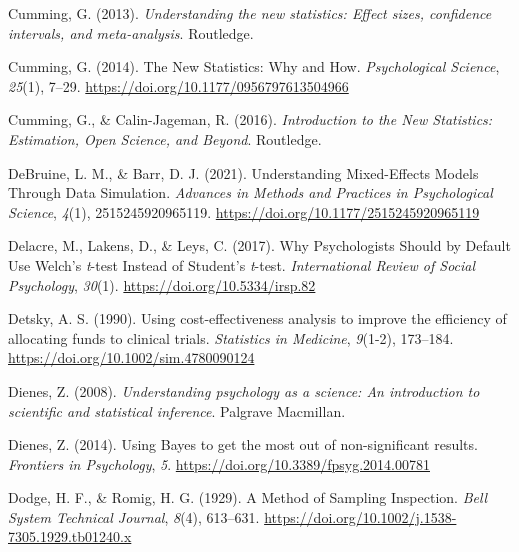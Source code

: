 \documentclass[
  letterpaper,
  DIV=11,
  numbers=noendperiod]{scrreprt}
\newlength{\cslhangindent}
\newlength{\cslentryspacingunit} %
\newenvironment{CSLReferences}[2] %
 {%
  \setlength{\parindent}{0pt}
  \ifodd #1
  \let\oldpar\par
  \def\par{\hangindent=\cslhangindent\oldpar}
  \fi
  \setlength{\parskip}{#2\cslentryspacingunit}
 }%
 {}
\begin{document}
\begin{CSLReferences}{1}{0}
\leavevmode{}%
Cumming, G. (2013). \emph{Understanding the new statistics: {Effect}
sizes, confidence intervals, and meta-analysis}. {Routledge}.

\leavevmode{}%
Cumming, G. (2014). The {New Statistics}: {Why} and {How}.
\emph{Psychological Science}, \emph{25}(1), 7--29.
\url{https://doi.org/10.1177/0956797613504966}

\leavevmode{}%
Cumming, G., \& Calin-Jageman, R. (2016). \emph{Introduction to the {New
Statistics}: {Estimation}, {Open Science}, and {Beyond}}. {Routledge}.

\leavevmode{}%
DeBruine, L. M., \& Barr, D. J. (2021). Understanding {Mixed-Effects
Models Through Data Simulation}. \emph{Advances in Methods and Practices
in Psychological Science}, \emph{4}(1), 2515245920965119.
\url{https://doi.org/10.1177/2515245920965119}

\leavevmode{}%
Delacre, M., Lakens, D., \& Leys, C. (2017). Why {Psychologists Should}
by {Default Use Welch}'s {\emph{t}}-test {Instead} of {Student}'s
{\emph{t}}-test. \emph{International Review of Social Psychology},
\emph{30}(1). \url{https://doi.org/10.5334/irsp.82}

\leavevmode{}%
Detsky, A. S. (1990). Using cost-effectiveness analysis to improve the
efficiency of allocating funds to clinical trials. \emph{Statistics in
Medicine}, \emph{9}(1-2), 173--184.
\url{https://doi.org/10.1002/sim.4780090124}

\leavevmode{}%
Dienes, Z. (2008). \emph{Understanding psychology as a science: {An}
introduction to scientific and statistical inference}. {Palgrave
Macmillan}.

\leavevmode{}%
Dienes, Z. (2014). Using {Bayes} to get the most out of non-significant
results. \emph{Frontiers in Psychology}, \emph{5}.
\url{https://doi.org/10.3389/fpsyg.2014.00781}

\leavevmode{}%
Dodge, H. F., \& Romig, H. G. (1929). A {Method} of {Sampling
Inspection}. \emph{Bell System Technical Journal}, \emph{8}(4),
613--631. \url{https://doi.org/10.1002/j.1538-7305.1929.tb01240.x}


\end{CSLReferences}
\end{document}
